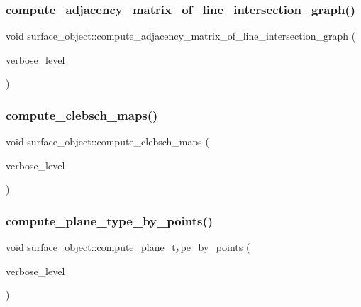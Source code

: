 \subsubsection{\texorpdfstring{compute\+\_\+adjacency\+\_\+matrix\+\_\+of\+\_\+line\+\_\+intersection\+\_\+graph()}{compute\_adjacency\_matrix\_of\_line\_intersection\_graph()}}
{\footnotesize\ttfamily void surface\+\_\+object\+::compute\+\_\+adjacency\+\_\+matrix\+\_\+of\+\_\+line\+\_\+intersection\+\_\+graph (\begin{DoxyParamCaption}\item[{\mbox{\hyperlink{galois_8h_a09fddde158a3a20bd2dcadb609de11dc}{I\+NT}}}]{verbose\+\_\+level }\end{DoxyParamCaption})}

\mbox{\label{classsurface__object_ad78297ade0f2cb687756f81ac18bc01e}} 
\subsubsection{\texorpdfstring{compute\+\_\+clebsch\+\_\+maps()}{compute\_clebsch\_maps()}}
{\footnotesize\ttfamily void surface\+\_\+object\+::compute\+\_\+clebsch\+\_\+maps (\begin{DoxyParamCaption}\item[{\mbox{\hyperlink{galois_8h_a09fddde158a3a20bd2dcadb609de11dc}{I\+NT}}}]{verbose\+\_\+level }\end{DoxyParamCaption})}

\mbox{\label{classsurface__object_a7ad585c88d5c8278850d5f4c9281798c}} 
\subsubsection{\texorpdfstring{compute\+\_\+plane\+\_\+type\+\_\+by\+\_\+points()}{compute\_plane\_type\_by\_points()}}
{\footnotesize\ttfamily void surface\+\_\+object\+::compute\+\_\+plane\+\_\+type\+\_\+by\+\_\+points (\begin{DoxyParamCaption}\item[{\mbox{\hyperlink{galois_8h_a09fddde158a3a20bd2dcadb609de11dc}{I\+NT}}}]{verbose\+\_\+level }\end{DoxyParamCaption})}


